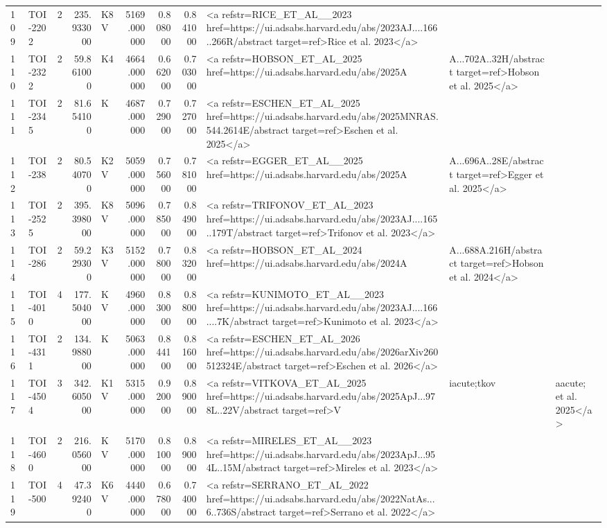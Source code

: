 \begin{tabular}{llrrlrrrl}
109 & TOI-2202 & 2 & 235.933000 & K8 V & 5169.000000 & 0.808000 & 0.841000 & <a refstr=RICE_ET_AL__2023 href=https://ui.adsabs.harvard.edu/abs/2023AJ....166..266R/abstract target=ref>Rice et al. 2023</a> \\
110 & TOI-2322 & 2 & 59.861000 & K4 & 4664.000000 & 0.662000 & 0.703000 & <a refstr=HOBSON_ET_AL_2025 href=https://ui.adsabs.harvard.edu/abs/2025A&A...702A..32H/abstract target=ref>Hobson et al. 2025</a> \\
111 & TOI-2345 & 2 & 81.654100 & K & 4687.000000 & 0.729000 & 0.727000 & <a refstr=ESCHEN_ET_AL_2025 href=https://ui.adsabs.harvard.edu/abs/2025MNRAS.544.2614E/abstract target=ref>Eschen et al. 2025</a> \\
112 & TOI-238 & 2 & 80.540700 & K2 V & 5059.000000 & 0.756000 & 0.781000 & <a refstr=EGGER_ET_AL__2025 href=https://ui.adsabs.harvard.edu/abs/2025A&A...696A..28E/abstract target=ref>Egger et al. 2025</a> \\
113 & TOI-2525 & 2 & 395.398000 & K8 V & 5096.000000 & 0.785000 & 0.849000 & <a refstr=TRIFONOV_ET_AL_2023 href=https://ui.adsabs.harvard.edu/abs/2023AJ....165..179T/abstract target=ref>Trifonov et al. 2023</a> \\
114 & TOI-286 & 2 & 59.229300 & K3 V & 5152.000000 & 0.780000 & 0.832000 & <a refstr=HOBSON_ET_AL_2024 href=https://ui.adsabs.harvard.edu/abs/2024A&A...688A.216H/abstract target=ref>Hobson et al. 2024</a> \\
115 & TOI-4010 & 4 & 177.504000 & K V & 4960.000000 & 0.830000 & 0.880000 & <a refstr=KUNIMOTO_ET_AL__2023 href=https://ui.adsabs.harvard.edu/abs/2023AJ....166....7K/abstract target=ref>Kunimoto et al. 2023</a> \\
116 & TOI-4311 & 2 & 134.988000 & K & 5063.000000 & 0.844100 & 0.816000 & <a refstr=ESCHEN_ET_AL_2026 href=https://ui.adsabs.harvard.edu/abs/2026arXiv260512324E/abstract target=ref>Eschen et al. 2026</a> \\
117 & TOI-4504 & 3 & 342.605000 & K1 V & 5315.000000 & 0.920000 & 0.890000 & <a refstr=VITKOVA_ET_AL_2025 href=https://ui.adsabs.harvard.edu/abs/2025ApJ...978L..22V/abstract target=ref>V&iacute;tkov&aacute; et al. 2025</a> \\
118 & TOI-4600 & 2 & 216.056000 & K V & 5170.000000 & 0.810000 & 0.890000 & <a refstr=MIRELES_ET_AL__2023 href=https://ui.adsabs.harvard.edu/abs/2023ApJ...954L..15M/abstract target=ref>Mireles et al. 2023</a> \\
119 & TOI-500 & 4 & 47.392400 & K6 V & 4440.000000 & 0.678000 & 0.740000 & <a refstr=SERRANO_ET_AL_2022 href=https://ui.adsabs.harvard.edu/abs/2022NatAs...6..736S/abstract target=ref>Serrano et al. 2022</a> \\

\end{tabular}
